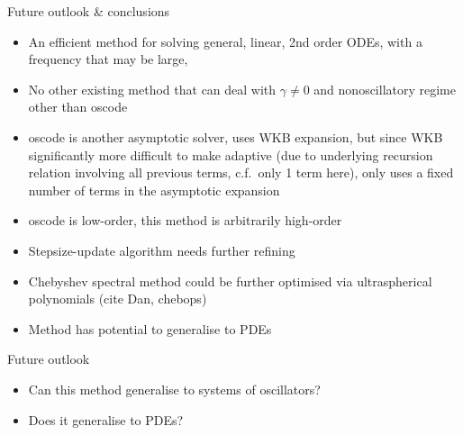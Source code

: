 \documentclass{beamer}
\numberwithin{equation}{theorem}
\begin{document}
\begin{noframe}
    Future outlook \& conclusions \\
    \medskip
    {\footnotesize
    \begin{itemize}
    \item{An efficient method for solving general, linear, 2nd order ODEs, with a frequency that may be large,}
    \item{No other existing method that can deal with $\gamma \neq 0$ and nonoscillatory regime other than oscode }
    \item{oscode is another asymptotic solver, uses WKB expansion, but since WKB significantly more difficult to make adaptive (due to underlying recursion relation involving all previous terms, c.f.\ only 1 term here), only uses a fixed number of terms in the asymptotic expansion}
    \item{oscode is low-order, this method is arbitrarily high-order}
    \end{itemize}
   }
   {\footnotesize
    \begin{itemize}
    \item{Stepsize-update algorithm needs further refining}
    \item{Chebyshev spectral method could be further optimised via ultraspherical polynomials (cite Dan, chebops)}
    \item{Method has potential to generalise to PDEs}
    \end{itemize}
   }
\end{noframe}

\begin{noframe}
    Future outlook \\
    \medskip
    {\footnotesize
    \begin{itemize}
    \item{Can this method generalise to systems of oscillators?}
    \item{Does it generalise to PDEs?}
    \end{itemize}
    }
\end{noframe}

\end{document}
